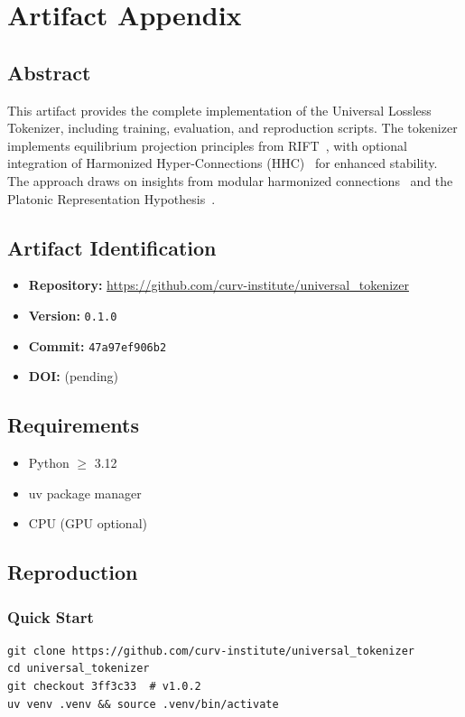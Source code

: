 \section*{Artifact Appendix}

\subsection*{Abstract}
This artifact provides the complete implementation of the Universal Lossless Tokenizer,
including training, evaluation, and reproduction scripts. The tokenizer implements
equilibrium projection principles from RIFT~\cite{rift2025}, with optional integration
of Harmonized Hyper-Connections (HHC)~\cite{miller2026hhc} for enhanced stability.
The approach draws on insights from modular harmonized connections~\cite{deepseek2024mhc}
and the Platonic Representation Hypothesis~\cite{miller2024prh}.

\subsection*{Artifact Identification}
\begin{itemize}
  \item \textbf{Repository:} \url{https://github.com/curv-institute/universal_tokenizer}
  \item \textbf{Version:} \texttt{0.1.0}
  \item \textbf{Commit:} \texttt{47a97ef906b2}
  \item \textbf{DOI:} (pending)
\end{itemize}

\subsection*{Requirements}
\begin{itemize}
  \item Python $\geq$ 3.12
  \item uv package manager
  \item CPU (GPU optional)
\end{itemize}

\subsection*{Reproduction}

\subsubsection*{Quick Start}
\begin{verbatim}
git clone https://github.com/curv-institute/universal_tokenizer
cd universal_tokenizer
git checkout 3ff3c33  # v1.0.2
uv venv .venv && source .venv/bin/activate
\end{verbatim}

